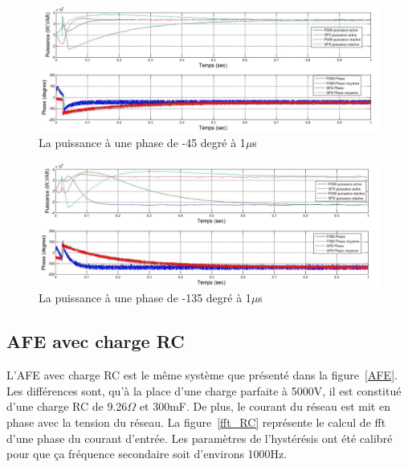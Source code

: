 \documentclass[11pt,letterpaper,final]{report}
\begin{document}
\begin{figure}[htb]
\centering
\includegraphics[scale=0.5]{Fig/AFEIDEAL/pui_45.jpg}
\caption{La puissance à une phase de -45 degré à 1$\mu$s}
\label{AF_I_pui__45}
\end{figure}

\begin{figure}[htb]
\centering
\includegraphics[scale=0.5]{Fig/AFEIDEAL/pui_135.jpg}
\caption{La puissance à une phase de -135 degré à 1$\mu$s}
\label{AF_I_pui__135}
\end{figure}


\clearpage
\subsection{AFE avec charge RC}
L'AFE avec charge RC est le même système que présenté dans la figure~\ref{AFE}. Les différences sont, qu'à la place d'une charge parfaite à 5000V, il est constitué d'une charge RC de 9.26$\Omega$ et 300mF.
De plus, le courant du réseau est mit en phase avec la tension du réseau. La figure~\ref{fft_RC} représente le calcul de fft d'une phase du courant d'entrée. Les paramètres de l'hystérésis ont été calibré pour que ça fréquence secondaire soit d'environs 1000Hz.
\end{document}
